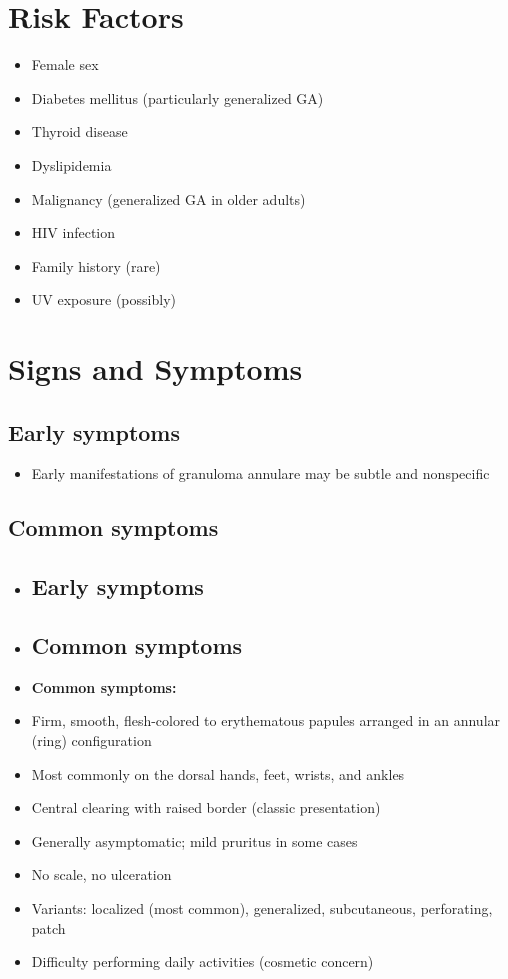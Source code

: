 \section{Risk Factors}

\begin{itemize}[noitemsep]
  \item Female sex
  \item Diabetes mellitus (particularly generalized GA)
  \item Thyroid disease
  \item Dyslipidemia
  \item Malignancy (generalized GA in older adults)
  \item HIV infection
  \item Family history (rare)
  \item UV exposure (possibly)
\end{itemize}

\section{Signs and Symptoms}

\subsection{Early symptoms}
\begin{itemize}[noitemsep]
  \item Early manifestations of granuloma annulare may be subtle and nonspecific
\end{itemize}

\subsection{Common symptoms}
\begin{itemize}[noitemsep]
  \item \subsection{Early symptoms}
  \item \subsection{Common symptoms}
  \item \textbf{Common symptoms:}
  \item Firm, smooth, flesh-colored to erythematous papules arranged in an annular (ring) configuration
  \item Most commonly on the dorsal hands, feet, wrists, and ankles
  \item Central clearing with raised border (classic presentation)
  \item Generally asymptomatic; mild pruritus in some cases
  \item No scale, no ulceration
  \item Variants: localized (most common), generalized, subcutaneous, perforating, patch
  \item Difficulty performing daily activities (cosmetic concern)
\end{itemize}

